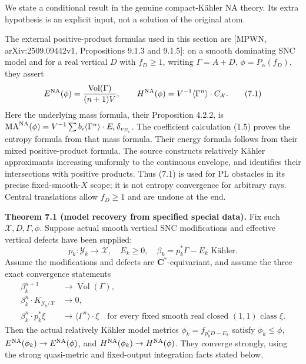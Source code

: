 \documentclass[
  11pt,
]{article}
\begin{document}
We state a conditional result in the genuine compact-Kähler NA theory.
Its extra hypothesis is an explicit input, not a solution of the
original atom.

The external positive-product formulas used in this section are {[}MPWN,
arXiv:2509.09442v1, Propositions 9.1.3 and 9.1.5{]}: on a smooth
dominating SNC model and for a real vertical \(D\) with \(f_D\geq1\),
writing \(\Gamma=A+D\), \(\phi=P_\alpha(f_D)\), they assert \[
 E^{\rm NA}(\phi)=\frac{\operatorname{Vol}(\Gamma)}{(n+1)V},\qquad
 H^{\rm NA}(\phi)=V^{-1}\langle\Gamma^n\rangle\cdot C_{\mathcal X}.
                                                               \tag{7.1}
\] Here the underlying mass formula, their Proposition 4.2.2, is
\(\operatorname{MA}^{\rm NA}(\phi)=V^{-1}\sum b_i\langle\Gamma^n\rangle\cdot E_i\,\delta_{v_{E_i}}\).
The coefficient calculation (1.5) proves the entropy formula from that
mass formula. Their energy formula follows from their mixed
positive-product formula. The source constructs relatively Kähler
approximants increasing uniformly to the continuous envelope, and
identifies their intersections with positive products. Thus (7.1) is
used for PL obstacles in its precise fixed-smooth-\(X\) scope; it is not
entropy convergence for arbitrary rays. Central translations allow
\(f_D\geq1\) and are undone at the end.

\textbf{Theorem 7.1 (model recovery from specified special data).} Fix
such \(\mathcal X,D,\Gamma,\phi\). Suppose actual smooth vertical SNC
modifications and effective vertical defects have been supplied: \[
 p_k:\mathcal Y_k\to\mathcal X,\quad E_k\geq0,\quad
 \beta_k=p_k^*\Gamma-E_k\text{ Kähler}.
\] Assume the modifications and defects are \(\mathbf C^*\)-equivariant,
and assume the three exact convergence statements \[
 \begin{split}
 \beta_k^{n+1}&\longrightarrow\operatorname{Vol}(\Gamma),\\
 \beta_k^n\cdot K_{\mathcal Y_k/\mathcal X}&\longrightarrow0,\\
 \beta_k^n\cdot p_k^*\xi&\longrightarrow\langle\Gamma^n\rangle\cdot\xi
       \quad\text{for every fixed smooth real closed $(1,1)$ class }\xi.
 \end{split}                                                  \tag{7.2}
\] Then the actual relatively Kähler model metrics
\(\phi_k=f_{p_k^*D-E_k}\) satisfy \(\phi_k\leq\phi\),
\(E^{\rm NA}(\phi_k)\to E^{\rm NA}(\phi)\), and
\(H^{\rm NA}(\phi_k)\to H^{\rm NA}(\phi)\). They converge strongly,
using the strong quasi-metric and fixed-output integration facts stated
below.
\end{document}
